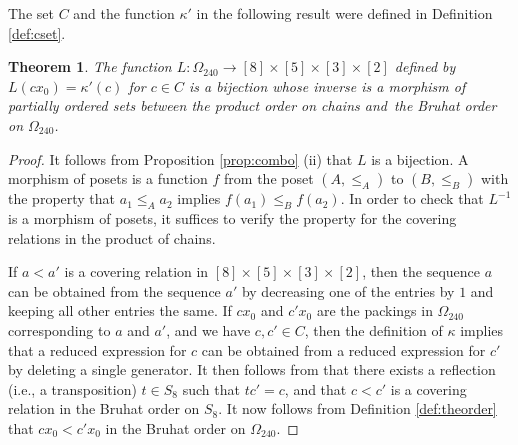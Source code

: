 \documentclass{amsart}
\theoremstyle{plain}
\newtheorem{theorem}{Theorem}[section]
\theoremstyle{definition}
\theoremstyle{remark}
\numberwithin{equation}{section}
\newcommand{\ra}{\rightarrow}
\newcommand{\qpx}{\Omega_{240}}
\newcommand{\leh}{\kappa}
\begin{document}
The set $C$ and the function $\leh'$ in the following result were defined in Definition \ref{def:cset}.

\begin{theorem}\label{thm:refines}
The function $L : \qpx \ra [8] \times [5] \times [3] \times [2]$ defined by $L(cx_0) = \leh'(c)$ for $c \in C$
is a bijection whose inverse is a morphism of partially ordered sets between the product order on chains and\
the Bruhat order on $\qpx$. 
\end{theorem}

\begin{proof}
It follows from Proposition \ref{prop:combo} (ii) that $L$ is a bijection.
A morphism of posets is a function $f$ from the poset $(A, \leq_A)$ to $(B, \leq_B)$ with the property that 
$a_1 \leq_A a_2$ implies $f(a_1) \leq_B f(a_2)$. In order to check that $L^{-1}$ is a morphism of posets,
it suffices to verify the property for the covering relations in the product of chains.

If $a < a'$ is a covering relation in $[8] \times [5] \times [3] \times [2]$, then the sequence $a$ can be
obtained from the sequence $a'$ by decreasing one of the entries by $1$ and keeping all other entries
the same. If $cx_0$ and $c'x_0$ are the packings in $\qpx$ corresponding to $a$ and $a'$, and we have
$c, c' \in C$, then the definition of $\leh$ implies that a reduced expression for $c$ can be obtained from a
reduced expression for $c'$ by deleting a single generator. It then follows from 
\cite[Theorem 5.10, Proposition 5.11]{humphreys90} that there exists a reflection (i.e., a transposition) 
$t \in S_8$ such that $tc' = c$, and that $c < c'$ is a covering relation in the Bruhat order on $S_8$.
It now follows from Definition \ref{def:theorder} that $cx_0 < c'x_0$ in the Bruhat order on $\qpx$.
\end{proof}
\end{document}
